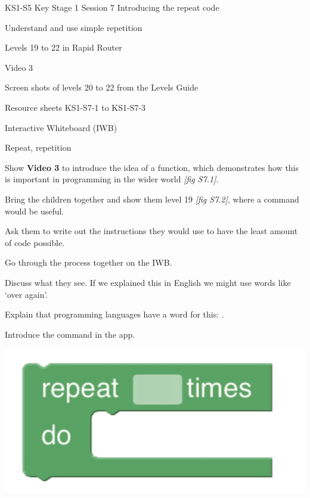 \documentclass{../../../lessonplan}
\begin{document}
\lessonplantitle
    {KS1-S5}
    {Key Stage 1 Session 7}
    {Introducing the repeat code}

\preamble
    {
    \item Understand and use simple repetition
    }
    {
    \item Levels 19 to 22 in Rapid Router
    \item Video 3
    \item Screen shots of levels 20 to 22 from the Levels Guide
    \item Resource sheets KS1-S7-1 to KS1-S7-3
    \item Interactive Whiteboard (IWB)
    }
    {
    \item Repeat, repetition
    }

\begin{lessonplan}

Show \textbf{Video 3} to introduce the idea of a  function, which demonstrates how this is important in programming in the wider world \textit{[fig S7.1]}.


Bring the children together and show them level 19 \textit{[fig S7.2]}, where a  command would be useful.


Ask them to write out the instructions they would use to have the least amount of code possible.

Go through the process together on the IWB.


Discuss what they see.
If we explained this in English we might use words like `over again'.

Explain that programming languages have a word for this: .

Introduce the  command in the app.

\begin{center}
\includegraphics[width=.667\linewidth]{repeat.jpg}
\end{center}


\end{lessonplan}
\end{document}
